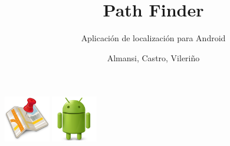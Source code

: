\documentclass{beamer}
\title{\textbf{Path Finder}}
\subtitle{Aplicaci\'on de localizaci\'on para Android}
\author{Almansi, Castro, Vileri\~no}
\date{}
\begin{document}
\begin{frame}
\titlepage
\vspace{-20mm}
\begin{center}
  \includegraphics[height=2cm]{imagenes/maps.png}
  \includegraphics[height=2cm]{imagenes/android.png}
\end{center}
\end{frame}





\end{document}
